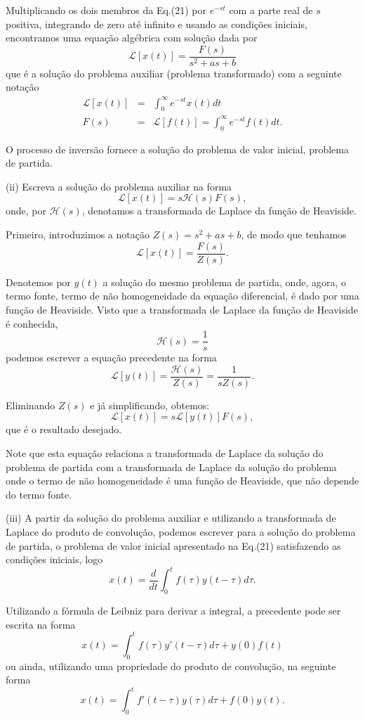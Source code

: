 Multiplicando os dois membros da Eq.(21) por $e^{-st}$ com a parte real de $s$ positiva, integrando de zero até infinito e usando as condições iniciais, encontramos uma equação algébrica com solução dada por
$$\mathscr{L}[x(t)] =
\dfrac{F(s)}{s^{2} + a s + b}
$$
que é a solução do problema auxiliar (problema transformado) com a seguinte notação
$$\begin{array}{rcl}
\mathscr{L}[x(t)]
&=&
\int_{0}^{\infty}
e^{-st}x(t) dt \\
F(s)
&=& \mathscr{L}[f(t)] =
\displaystyle\int_{0}^{\infty}
e^{-st}f(t) dt.
\end{array}$$

O processo de inversão fornece a solução do problema de valor inicial, problema de partida.

(ii) Escreva a solução do problema auxiliar na forma
$$\mathscr{L}[x(t)] = s \mathscr{H}(s) F(s),$$
onde, por $\mathscr{H}(s)$, denotamos a transformada de Laplace da função de Heaviside.

Primeiro, introduzimos a notação $Z(s) = s^{2} + a s + b$, de modo que tenhamos
$$\mathscr{L}[x(t)] = \dfrac{F(s)}{Z(s)}.$$

Denotemos por $y(t)$ a solução do mesmo problema de partida, onde, agora, o termo fonte, termo de não homogeneidade da equação diferencial, é dado por uma função de Heaviside. Visto que a transformada de Laplace da função de Heaviside é conhecida,
$$\mathscr{H}(s) = \dfrac{1}{s}$$
podemos escrever a equação precedente na forma
$$\mathscr{L}[y(t)] =
\dfrac{\mathscr{H}(s)}{Z(s)}
=
\dfrac{1}{sZ(s)}.$$

Eliminando $Z(s)$ e já simplificando, obtemos:
\begin{equation}\label{eq:aula04.22}
\mathscr{L}[x(t)] = s \mathscr{L}[y(t)]F(s),
\end{equation}
que é o resultado desejado.

Note que esta equação relaciona a transformada de Laplace da solução do problema de partida com a transformada de Laplace da solução do problema onde o termo de não homogeneidade é uma função de Heaviside, que não depende do termo fonte.

(iii) A partir da solução do problema auxiliar e utilizando a transformada de Laplace do produto de convolução, podemos escrever para a solução do problema de partida, o problema de valor inicial apresentado na Eq.(21) satisfazendo as condições iniciais, logo
$$x(t) =
\dfrac{d}{dt}
\int_{0}^{t}
f(\tau)y(t - \tau) d\tau.$$

Utilizando a fórmula de Leibniz para derivar a integral, a precedente pode ser escrita na forma
$$x(t) =
\int_{0}^{t}
f(\tau)y'(t - \tau) d\tau + y(0)f(t)$$
ou ainda, utilizando uma propriedade do produto de convolução, na seguinte forma
$$x(t) =
\int_{0}^{t}
f'(t - \tau)y(\tau) d\tau + f(0)y(t).$$


